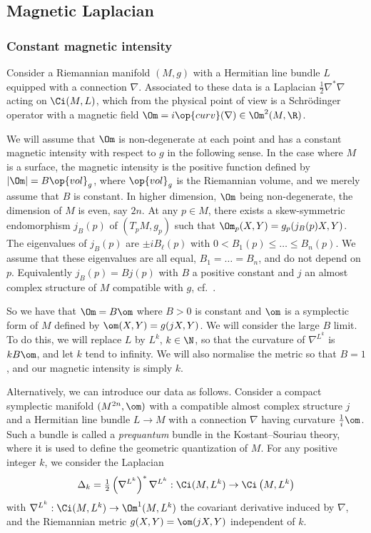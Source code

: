 \subsection{Magnetic Laplacian}

\subsubsection{Constant magnetic intensity}
Consider a Riemannian manifold $(M,g)$ with a Hermitian line bundle $L $ equipped with a connection $\nabla$. Associated to these data is a Laplacian $\frac{1}{2} \nabla^*
\nabla$ acting on $\Ci (M, L)$, which from the physical point of view is a Schr\"odinger operator with a magnetic field $\Om = i \op{curv} (\nabla) \in
\Om^2 (M, \R)$.

We will assume that $\Om$ is non-degenerate at each point and has a constant magnetic intensity with respect to $g$ in the following sense. In the case where $M$ is a surface, the magnetic intensity is the positive function defined by $ |\Om| = B \op{vol}_g$, where $\op{vol}_g $ is the Riemannian volume, and we merely assume that $B$ is constant. In higher dimension, $\Om$ being non-degenerate, the dimension of $M$ is even, say $2n$. At any $p \in M$, there exists a skew-symmetric endomorphism $j_B (p)$ of $(T_pM, g_p)$ such that $\Om_p (X,Y) = g_p (j_B(p) X, Y)$. The eigenvalues of $j_B(p)$ are $ \pm i B_{\ell} (p)$ with $0 < B_1(p) \leqslant \ldots \leqslant B_n (p)$. We assume that these eigenvalues are all equal, $B_1 = \ldots = B_{n}$, and do not depend on $p$. Equivalently $j_B(p) = B j(p)$ with $B$ a positive constant and $j$ an almost complex structure of $M$ compatible with $g$, cf.~\cite[Proposition~2.5.6]{McSa}.

So we have that $\Om = B \om$ where $B >0$ is constant and $\om$ is a symplectic form of $M$ defined by $\om (X,Y) = g (jX, Y)$. We will consider the large $B$ limit. To do this, we will replace $L$ by $L^k$, $k \in \N$, so that the curvature of $\nabla^{L^k}$ is $k B \om$, and let $k$ tend to infinity. We will also normalise the metric so that $B=1$, and our magnetic intensity is simply $k$.

Alternatively, we can introduce our data as follows. Consider a compact symplectic manifold $(M^{2n}, \om)$ with a compatible almost complex structure $j$ and a Hermitian line bundle $L \rightarrow M$ with a connection $\nabla$ having curvature $\frac{1}{i} \om$. Such a bundle is called a {\em prequantum} bundle in the Kostant--Souriau theory, where it is used to define the geometric quantization of $M$. For any positive integer $k$, we consider the Laplacian
\begin{gather}
\Delta_k = \tfrac{1}{2}\left(\nabla^{L^k}\right)^* \nabla^{L^k} : \Ci (M, L^k)\rightarrow \Ci \left(M, L^k\right)
\end{gather}
with $\nabla^{L^k} : \Ci (M, L^k) \rightarrow \Om^1 (M, L^k)$ the covariant derivative induced by $\nabla$, and the Riemannian metric $g(X,Y) = \om (jX, Y)$ independent of $k$.


